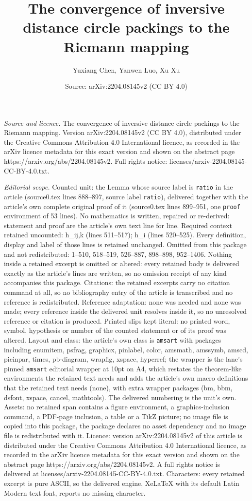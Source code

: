 \documentclass[10pt,a4paper]{amsart}
\title[The convergence of inversive distance circle packings to the]{The convergence of inversive distance circle packings to the Riemann mapping}
\author{Yuxiang Chen, Yanwen Luo, Xu Xu}
\date{Source: arXiv:2204.08145v2 (CC BY 4.0)}
\begin{document}
\maketitle

\noindent\emph{Source and licence.} The convergence of inversive distance circle packings to the Riemann mapping. Version arXiv:2204.08145v2 (CC BY 4.0), distributed under the Creative Commons Attribution 4.0 International licence, as recorded in the arXiv licence metadata for this exact version and shown on the abstract page https://arxiv.org/abs/2204.08145v2. Full rights notice: licenses/arxiv-2204.08145-CC-BY-4.0.txt.\par\smallskip

\noindent\textit{Editorial scope.} Counted unit: the Lemma whose source label is \texttt{ratio} in the article (source0.tex lines 888--897, source label \texttt{ratio}), delivered together with the article's own complete original proof of it (source0.tex lines 899--951, one \texttt{proof} environment of 53 lines). No mathematics is written, repaired or re-derived: statement and proof are the article's own text line for line. Required context retained uncounted: h\_ij,k (lines 511--517); h\_i (lines 520--525). Every definition, display and label of those lines is retained unchanged. Omitted from this package and not redistributed: 1--510, 518--519, 526--887, 898--898, 952--1406. Nothing inside a retained excerpt is omitted or altered: every retained body is delivered exactly as the article's lines are written, so no omission receipt of any kind accompanies this package. Citations: the retained excerpts carry no citation command at all, so no bibliography entry of the article is transcribed and no reference is redistributed. Reference adaptation: none was needed and none was made; every reference inside the delivered unit resolves inside it, so no unresolved reference or citation is produced. Printed slips kept literal: no printed word, symbol, hypothesis or number of the counted statement or of its proof was altered. Layout and class: the article's own class is \texttt{amsart} with packages including enumitem, psfrag, graphicx, pinlabel, color, amsmath, amssymb, amscd, picinpar, times, pb-diagram, wrapfig, xspace, hyperref; the wrapper is the lane's pinned \texttt{amsart} editorial wrapper at 10pt on A4, which restates the theorem-like environments the retained text needs and adds the article's own macro definitions that the retained text needs (none), with extra wrapper packages (bm, bbm, dsfont, xspace, cancel, mathtools). The delivered numbering is the unit's own. Assets: no retained span contains a figure environment, a graphics-inclusion command, a PDF-page inclusion, a table or a TikZ picture; no image file is copied into this package, the package declares no asset dependency and no image file is redistributed with it. Licence: version arXiv:2204.08145v2 of this article is distributed under the Creative Commons Attribution 4.0 International licence, as recorded in the arXiv licence metadata for this exact version and shown on the abstract page https://arxiv.org/abs/2204.08145v2. A full rights notice is delivered at licenses/arxiv-2204.08145-CC-BY-4.0.txt. Characters: every retained excerpt is pure ASCII, so the delivered engine, XeLaTeX with its default Latin Modern text font, reports no missing character.
\end{document}
